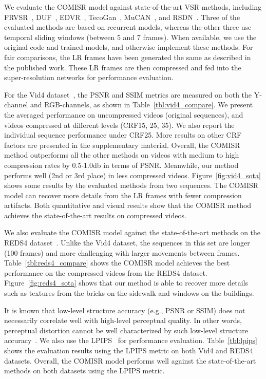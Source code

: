 We evaluate the COMISR model against state-of-the-art VSR methods, including FRVSR~\cite{frvsr}, DUF~\cite{duf}, EDVR~\cite{edvr}, TecoGan~\cite{tecogan2020}, MuCAN~\cite{mucan}, and RSDN~\cite{rsdn}.
Three of the evaluated methods are based on recurrent models, whereas the other three use temporal sliding windows (between 5 and 7 frames).
When available, we use the original code and trained models, and otherwise implement these methods.
For fair comparisons, the LR frames have been generated the same as described in the published work. 
These LR frames are then compressed and fed into the super-resolution networks for performance evaluation.

For the Vid4 dataset~\cite{vid4}, the PSNR and SSIM metrics are measured on both the Y-channel and RGB-channels, as shown in Table~\ref{tbl:vid4_compare}. 
We present the averaged performance on uncompressed videos (original sequences), and videos compressed at different levels (CRF15, 25, 35).
We also report the individual sequence performance under CRF25.
More results on other CRF factors are presented in the supplementary material. 
Overall, the COMISR method outperforms all the other methods on videos with medium to high compression rates by 0.5-1.0db in terms of PSNR. 
Meanwhile, our method performs well (2nd or 3rd place) in less compressed videos.
Figure~\ref{fig:vid4_sota} shows some results by the evaluated methods from two sequences. 
The COMISR model can recover more details from the LR frames with fewer compression artifacts.
Both quantitative and visual results show that the COMISR method achieves the state-of-the-art results on compressed videos. 

We also evaluate the COMISR model against the state-of-the-art methods on the REDS4 dataset~\cite{Nah_2019_CVPR_Workshops_REDS}.
Unlike the Vid4 dataset, the sequences in this set are longer (100 frames) and more challenging with larger movements between frames. 
Table~\ref{tbl:reds4_compare} shows the COMISR model achieves the best performance on the compressed videos from the REDS4 dataset.
Figure~\ref{fig:reds4_sota} shows that 
our method is able to recover more details such as textures from the bricks on the sidewalk and windows on the buildings.

It is known that low-level structure accuracy (e.g., PSNR or SSIM) does not necessarily correlate well with high-level 
perceptual quality.
In other words, perceptual distortion cannot be well characterized by such low-level structure accuracy~\cite{blau2018}.
We also use the LPIPS~\cite{zhang2018perceptual} for performance evaluation. 
Table~\ref{tbl:lpips} shows the evaluation results using the LPIPS metric on both Vid4 and REDS4 datasets. 
Overall, the COMISR model performs well against the state-of-the-art methods on both datasets using the LPIPS metric.



